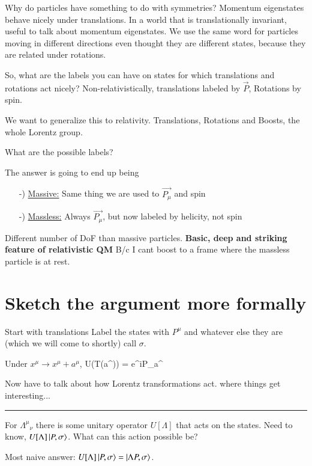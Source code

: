 {Why do particles have something to do with symmetries?
Momentum eigenstates behave nicely under translations. 
In a world that is translationally invariant, useful to talk about momentum eigenstates. 
We use the same word for particles moving in different directions even thought they are different states, because they are related under rotations. 

So, what are the labels you can have on states for which translations and rotations act nicely?
Non-relativistically, translations labeled by $\vec{P}$, Rotations by spin. 

We want to generalize this to relativity. 
Translations, Rotations and Boosts, the whole Lorentz group.

What are the possible labels?

The answer is going to end up being
\begin{itemize}
\item[-)] \underline{Massive:} Same thing we are used to $\vec{P_\mu}$ and spin
\item[-)] \underline{Massless:} Always $\vec{P_\mu}$, but now labeled by helicity, not spin
\end{itemize}

Different number of DoF than massive particles.  
\textbf{Basic, deep and striking feature of relativistic QM}
B/c I cant boost to a frame where the massless particle is at rest.

\section*{Sketch the argument more formally}

Start with translations
\be
{}
\ee
Label the states with $P^\mu$ and whatever else they are (which we will come to shortly) call $\sigma$.

Under $x^\mu\rightarrow x^\mu + a^\mu$,
\be
U(T(a^\mu))  = e^{iP_\mu a^\mu}
\ee

Now have to talk about how Lorentz transformations act. 
where things get interesting...


\noindent\rule{\textwidth}{1pt}

For ${\Lambda^\mu}_\nu$ there is some unitary operator $U[\Lambda]$ that acts on the states.
Need to know, $U[\Lambda] \ket{P, \sigma}$.
What can this action possible be?

Most naive answer:  $U[\Lambda] \ket{P, \sigma} = \ket{\Lambda P, \sigma}$.

}
